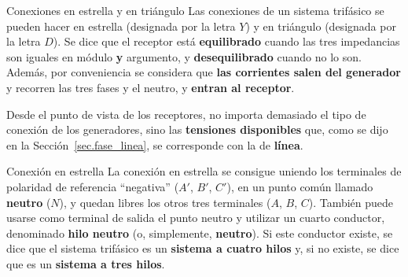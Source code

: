 \documentclass[11pt]{book} %
\makeatletter
\numberwithin{dummy}{section}
\theoremstyle{ocrenumbox}
\theoremstyle{blacknumex}
\theoremstyle{blacknumbox}
\theoremstyle{ocrenum}
\newenvironment{remark}{\par\vspace{10pt}\small %
\begin{list}{}{
\leftmargin=35pt %
\rightmargin=25pt}\item\ignorespaces %
\makebox[-2.5pt]{\begin{tikzpicture}[overlay]
\node[draw=ocre!60,line width=1pt,circle,fill=ocre!25,font=\sffamily\bfseries,inner sep=2pt,outer sep=0pt] at (-15pt,0pt){\textcolor{ocre}{N}};\end{tikzpicture}} %
\advance\baselineskip -1pt}{\end{list}\vskip5pt} %
\renewcommand{\section}{\@startsection{section}{1}{\z@}
{-4ex \@plus -1ex \@minus -.4ex}
{1ex \@plus.2ex }
{\normalfont\large\sffamily\bfseries}}
\renewcommand{\subsection}{\@startsection {subsection}{2}{\z@}
{-3ex \@plus -0.1ex \@minus -.4ex}
{0.5ex \@plus.2ex }
{\normalfont\sffamily\bfseries}}
\newlength\esp
\makeatother
\begin{document}
	
	
	
	
	
	
	
	\section{Conexiones en estrella y en triángulo}\label{sec.conexiones}
	Las conexiones de un sistema trifásico se pueden hacer en estrella (designada por la letra $Y$) y en triángulo (designada por la letra $D$). Se dice que el receptor está \textbf{equilibrado} cuando las tres impedancias son iguales en módulo \textbf{y} argumento, y \textbf{desequilibrado} cuando no lo son. Además, por conveniencia se considera que \textbf{las corrientes salen del generador} y recorren las tres fases y el neutro, y \textbf{entran al receptor}.
	
	\begin{remark}
	    Desde el punto de vista de los receptores, no importa demasiado el tipo de conexión de los generadores, sino las \textbf{tensiones disponibles} que, como se dijo en la Sección~\ref{sec.fase_linea}, se corresponde con la de \textbf{línea}.
	\end{remark}
	
	
	\subsection{Conexión en estrella}
	La conexión en estrella se consigue uniendo los terminales de polaridad de referencia ``negativa'' ($A'$, $B'$, $C'$), en un punto común llamado \textbf{neutro} ($N$), y quedan libres los otros tres terminales ($A$, $B$, $C$). También puede usarse como terminal de salida el punto neutro y utilizar un cuarto conductor, denominado \textbf{hilo neutro} (o, simplemente, \textbf{neutro}). Si este conductor existe, se dice que el sistema trifásico es un \textbf{sistema a cuatro hilos} y, si no existe, se dice que es un \textbf{sistema a tres hilos}. 
	
\end{document}
